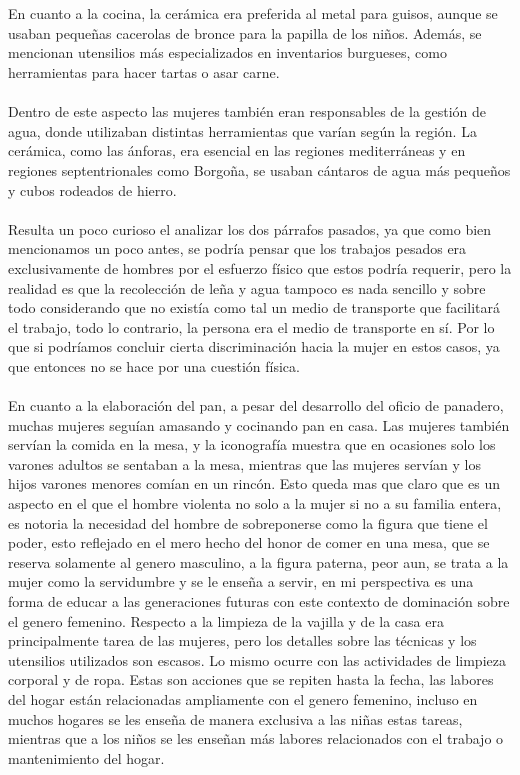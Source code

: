 \documentclass{report}
\begin{document}
\\\\
En cuanto a la cocina, la cerámica era preferida al metal para guisos, aunque se usaban pequeñas cacerolas de bronce para la papilla de los niños. Además, se mencionan utensilios más especializados en inventarios burgueses, como herramientas para hacer tartas o asar carne.
\\\\
Dentro de este aspecto las mujeres también eran responsables de la gestión de agua, donde utilizaban distintas herramientas que varían según la región. La cerámica, como las ánforas, era esencial en las regiones mediterráneas y en regiones septentrionales como Borgoña, se usaban cántaros de agua más pequeños y cubos rodeados de hierro. 
\\\\
Resulta un poco curioso el analizar los dos párrafos pasados, ya que como bien mencionamos un poco antes, se podría pensar que los trabajos pesados era exclusivamente de hombres por el esfuerzo físico que estos podría requerir, pero la realidad es que la recolección de leña y agua tampoco es nada sencillo y sobre todo considerando que no existía como tal un medio de transporte que facilitará el trabajo, todo lo contrario, la persona era el medio de transporte en sí. Por lo que si podríamos concluir cierta discriminación hacia la mujer en estos casos, ya que entonces no se hace por una cuestión física. 
\\\\
En cuanto a la elaboración del pan, a pesar del desarrollo del oficio de panadero, muchas mujeres seguían amasando y cocinando pan en casa. Las mujeres también servían la comida en la mesa, y la iconografía muestra que en ocasiones solo los varones adultos se sentaban a la mesa, mientras que las mujeres servían y los hijos varones menores comían en un rincón. Esto queda mas que claro que es un aspecto en el que el hombre violenta no solo a la mujer si no a su familia entera, es notoria la necesidad del hombre de sobreponerse como la figura que tiene el poder, esto reflejado en el mero hecho del honor de comer en una mesa, que se reserva solamente al genero masculino, a la figura paterna, peor aun, se trata a la mujer como la servidumbre y se le enseña a servir, en mi perspectiva es una forma de educar a las generaciones futuras con este contexto de dominación sobre el genero femenino. 
\newpage
Respecto a la limpieza de la vajilla y de la casa era principalmente tarea de las mujeres, pero los detalles sobre las técnicas y los utensilios utilizados son escasos. Lo mismo ocurre con las actividades de limpieza corporal y de ropa. Estas son acciones que se repiten hasta la fecha, las labores del hogar están relacionadas ampliamente con el genero femenino, incluso en muchos hogares se les enseña de manera exclusiva a las niñas estas tareas, mientras que a los niños se les enseñan más labores relacionados con el trabajo o mantenimiento del hogar. 
\end{document}
